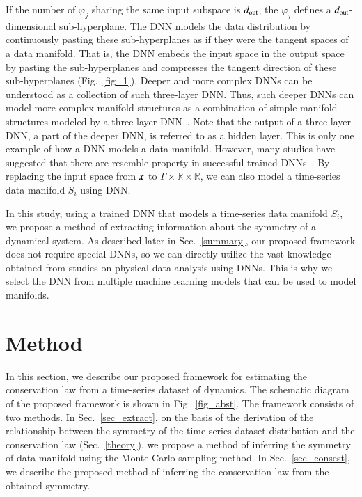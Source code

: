 \documentclass[preprint,
bibnotes,
 amsmath,amssymb,
 aps,
]{revtex4-1}
\newcounter{num}
\begin{document}
If the number of $\varphi_j$ sharing the same input subspace is $d_{\rm out}$, the $\varphi_j$ defines a $d_{\rm out}$-dimensional sub-hyperplane. 
The DNN models the data distribution by continuously pasting these sub-hyperplanes as if they were the tangent spaces of a data manifold. 
That is, the DNN embeds the input space in the output space by pasting the sub-hyperplanes and compresses the tangent direction of these sub-hyperplanes (Fig.~\ref{fig_1}). 
Deeper and more complex DNNs can be understood as a collection of such three-layer DNN. 
Thus, such deeper DNNs can model more complex manifold structures as a combination of simple manifold structures modeled by a three-layer DNN~\cite{basri2016efficient}. 
Note that the output of a three-layer DNN, a part of the deeper DNN, is referred to as a hidden layer. 
This is only one example of how a DNN models a data manifold. However, many studies have suggested that there are resemble property in successful trained DNNs~\cite{Irie_1990,Hinton_Reducing_2006,brahma2016deep,basri2016efficient,Rifai_The_2011,mototakearob}. By replacing the input space from $\textit{\textbf{x}}$ to $\Gamma \times \mathbb{R} \times \mathbb{R}$, we can also model a time-series data manifold $S_i$ using DNN.\par
In this study, using a trained DNN that models a time-series data manifold $S_i$, we propose a method of extracting information about the symmetry of a dynamical system. 
As described later in Sec.~\ref{summary}, our proposed framework does not require special DNNs, so we can directly utilize the vast knowledge obtained from studies on physical data analysis using DNNs.
This is why we select the DNN from multiple machine learning models that can be used to model manifolds. 


\section{Method}
In this section, we describe our proposed framework for estimating the conservation law from a time-series dataset of dynamics. 
The schematic diagram of the proposed framework is shown in Fig.~\ref{fig_abst}. 
The framework consists of two methods. 
In Sec.~\ref{sec_extract}, on the basis of the derivation of the relationship between the symmetry of the time-series dataset distribution and the conservation law (Sec.~\ref{theory}), we propose a method of inferring the symmetry of data manifold using the Monte Carlo sampling method. 
In Sec.~\ref{sec_consest}, we describe the proposed method of inferring the conservation law from the obtained symmetry. 
\end{document}

